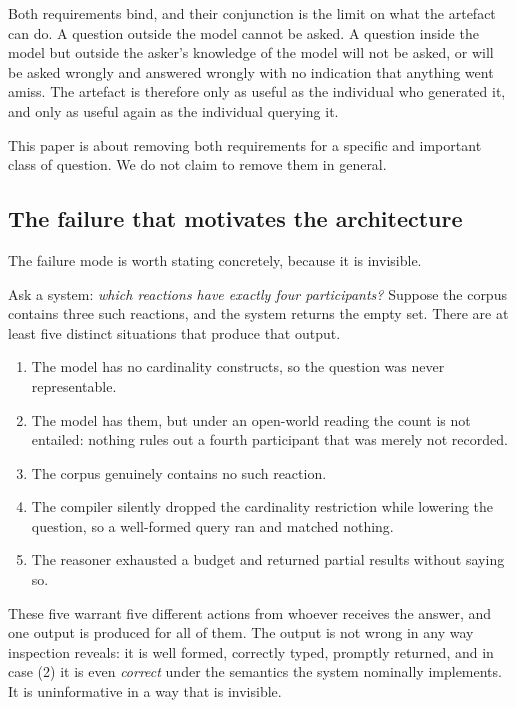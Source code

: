 \documentclass[11pt,twocolumn,a4paper]{article}
\theoremstyle{thmstyle}
\theoremstyle{definition}
\theoremstyle{remark}
\begin{document}
Both requirements bind, and their conjunction is the limit on what the
artefact can do. A question outside the model cannot be asked. A question
inside the model but outside the asker's knowledge of the model will not be
asked, or will be asked wrongly and answered wrongly with no indication that
anything went amiss. The artefact is therefore only as useful as the
individual who generated it, and only as useful again as the individual
querying it.

This paper is about removing both requirements for a specific and important
class of question. We do not claim to remove them in general.

\subsection{The failure that motivates the architecture}
\label{sec:fivecases}

The failure mode is worth stating concretely, because it is invisible.

Ask a system: \emph{which reactions have exactly four participants?} Suppose
the corpus contains three such reactions, and the system returns the empty
set. There are at least five distinct situations that produce that output.

\begin{enumerate}[leftmargin=2.2em,itemsep=2pt]
\item The model has no cardinality constructs, so the question was never
      representable.
\item The model has them, but under an open-world reading the count is not
      entailed: nothing rules out a fourth participant that was merely not
      recorded.
\item The corpus genuinely contains no such reaction.
\item The compiler silently dropped the cardinality restriction while lowering
      the question, so a well-formed query ran and matched nothing.
\item The reasoner exhausted a budget and returned partial results without
      saying so.
\end{enumerate}

These five warrant five different actions from whoever receives the answer,
and one output is produced for all of them. The output is not wrong in any way
inspection reveals: it is well formed, correctly typed, promptly returned, and
in case (2) it is even \emph{correct} under the semantics the system nominally
implements. It is uninformative in a way that is invisible.
\end{document}
